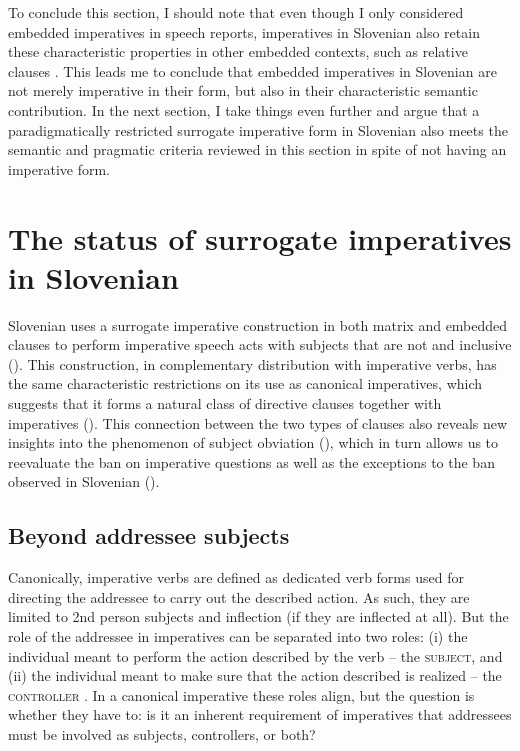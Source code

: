 \documentclass[output=paper,colorlinks,citecolor=brown]{langscibook}
\begin{document}
To conclude this section, I should note that even though I only considered embedded imperatives in speech reports, imperatives in Slovenian also retain these characteristic properties in other embedded contexts, such as relative clauses \citep[for the latter, see][]{kaufmannstegovec19}. This leads me to conclude that embedded imperatives in Slovenian are not merely imperative in their form, but also in their characteristic semantic contribution. In the next section, I take things even further and argue that a paradigmatically restricted surrogate imperative form in Slovenian also meets the semantic and pragmatic criteria reviewed in this section in spite of not having an imperative form.


\section{The status of surrogate imperatives in Slovenian}
\label{sec:lessons}

Slovenian uses a surrogate imperative construction in both matrix and embedded clauses to perform imperative speech acts with subjects that are not \snd{} and inclusive \fst{} (). This construction, in complementary distribution with imperative verbs, has the same characteristic restrictions on its use as canonical imperatives, which suggests that it forms a natural class of directive clauses together with imperatives (). This connection between the two types of clauses also reveals new insights into the phenomenon of subject obviation (), which in turn allows us to reevaluate the ban on imperative questions as well as the exceptions to the ban observed in Slovenian ().       

\subsection{Beyond addressee subjects}
\label{subsec:directives}

Canonically, imperative verbs are defined as dedicated verb forms used for directing the addressee to carry out the described action. As such, they are limited to 2nd person subjects and inflection (if they are inflected at all). But the role of the addressee in imperatives can be separated into two roles: (i) the individual meant to perform the action described by the verb -- the \textsc{subject}, and (ii) the individual meant to make sure that the action described is realized -- the \textsc{controller} \citep{belnapetal01,kaufmann21}. In a canonical imperative these roles align, but the question is whether they have to: is it an inherent requirement of imperatives that addressees must be involved as subjects, controllers, or both?
\end{document}
